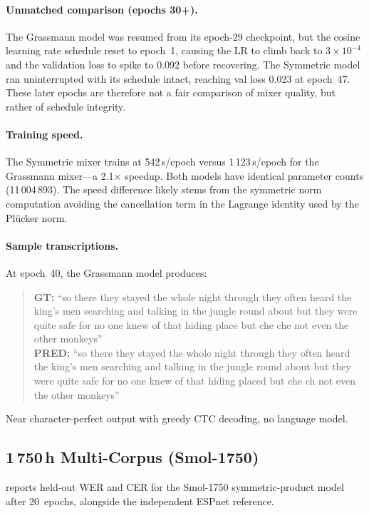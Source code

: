 \documentclass[11pt,a4paper]{article}
\newcommand{\plucker}{Pl\"{u}cker}
\begin{document}
\paragraph{Unmatched comparison (epochs 30+).}
The Grassmann model was resumed from its epoch-29 checkpoint, but
the cosine learning rate schedule reset to epoch~1, causing the LR
to climb back to $3 \times 10^{-4}$ and the validation loss to spike
to 0.092 before recovering.  The Symmetric model ran uninterrupted
with its schedule intact, reaching val loss 0.023 at epoch~47.  These
later epochs are therefore not a fair comparison of mixer quality,
but rather of schedule integrity.

\paragraph{Training speed.}
The Symmetric mixer trains at 542\,s/epoch versus 1\,123\,s/epoch for
the Grassmann mixer---a 2.1$\times$ speedup.  Both models have
identical parameter counts (11\,004\,893).  The speed difference likely
stems from the symmetric norm computation avoiding the cancellation
term in the Lagrange identity used by the \plucker{} norm.

\paragraph{Sample transcriptions.}
At epoch~40, the Grassmann model produces:
\begin{quote}
\small
\textbf{GT:} ``so there they stayed the whole night through they often
heard the king's men searching and talking in the jungle round about
but they were quite safe for no one knew of that hiding place but
che che not even the other monkeys'' \\
\textbf{PRED:} ``so there they stayed the whole night through they
often heard the king's men searching and talking in the jungle round
about but they were quite safe for no one knew of that hiding placed
but che ch not even the other monkeys''
\end{quote}
Near character-perfect output with greedy CTC decoding, no language
model.

\subsection{1\,750\,h Multi-Corpus (Smol-1750)}
\label{sec:results_1750}

 reports held-out WER and CER for the Smol-1750
symmetric-product model after 20~epochs, alongside the independent
ESPnet reference.
\end{document}
